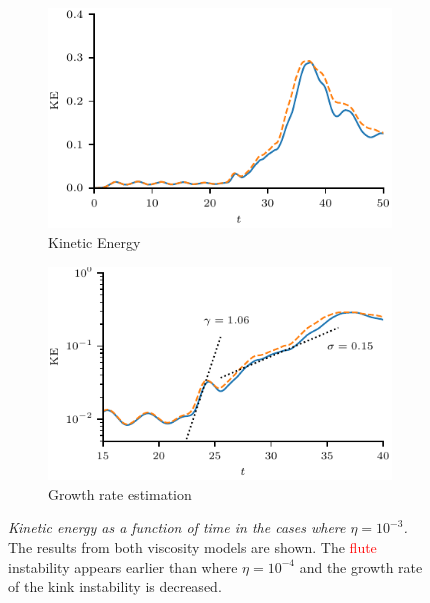 \documentclass[12pt]{article}
\newcommand{\rs}[2]{\textcolor{red}{#2}}
\newcommand{\mycaption}[2]{\caption[#1]{\emph{#1} #2}}
\begin{document}
\begin{figure}[t]
  \centering
    \begin{subfigure}{0.49\textwidth}
      \includegraphics[width=\linewidth]{kinetic_energy-3.pdf}
      \caption{Kinetic Energy}
      \label{fig:kink_ke-3}
    \end{subfigure}
    \hfill
    \begin{subfigure}{0.49\textwidth}
      \includegraphics[width=\linewidth]{kinetic_energy_log-3.pdf}
      \caption{Growth rate estimation}
      \label{fig:kink_ke_log-3}
    \end{subfigure}
\mycaption{Kinetic energy as a function of time in the cases where $\eta=10^{-3}$.}{The results from both viscosity models are shown. The \rs{fluting}{flute} instability appears earlier than where $\eta=10^{-4}$ and the growth rate of the kink instability is decreased.}
\label{fig:kink_str8_ke-3}%
\end{figure}
\end{document}
